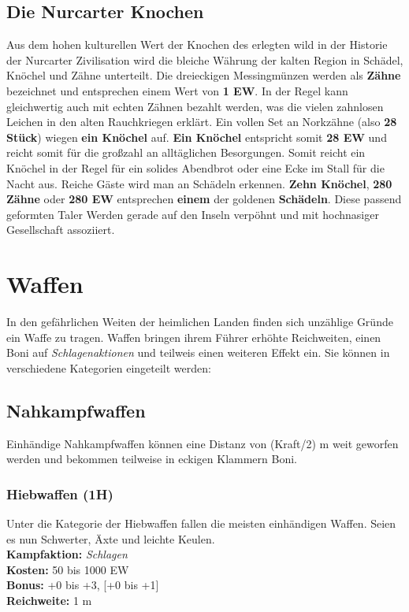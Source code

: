 \subsection*{Die Nurcarter Knochen}
Aus dem hohen kulturellen Wert der Knochen des erlegten wild in der Historie der Nurcarter Zivilisation wird die bleiche Währung der kalten Region in Schädel, Knöchel und Zähne unterteilt.
Die dreieckigen Messingmünzen werden als \textbf{Zähne} bezeichnet und entsprechen einem Wert von \textbf{1 EW}. In der Regel kann gleichwertig auch mit echten Zähnen bezahlt werden, was die vielen zahnlosen Leichen in den alten Rauchkriegen erklärt. Ein vollen Set an Norkzähne (also \textbf{28 Stück}) wiegen \textbf{ein Knöchel} auf. \textbf{Ein Knöchel} entspricht somit \textbf{28 EW} und reicht somit für die großzahl an alltäglichen Besorgungen. Somit reicht ein Knöchel in der Regel für ein solides Abendbrot oder eine Ecke im Stall für die Nacht aus. Reiche Gäste wird man an Schädeln erkennen. \textbf{Zehn Knöchel}, \textbf{280 Zähne} oder \textbf{280 EW} entsprechen \textbf{einem} der goldenen \textbf{Schädeln}. Diese passend geformten Taler Werden gerade auf den Inseln verpöhnt und mit hochnasiger Gesellschaft assoziiert.


\section{Waffen} \label{waffen}
In den gefährlichen Weiten der heimlichen Landen finden sich unzählige Gründe ein Waffe zu tragen. Waffen bringen ihrem Führer erhöhte Reichweiten, einen Boni auf \textit{Schlagenaktionen} und teilweis einen weiteren Effekt ein. Sie können in verschiedene Kategorien eingeteilt werden:\\

\subsection*{Nahkampfwaffen}
Einhändige Nahkampfwaffen können eine Distanz von (Kraft/2) m weit geworfen werden und bekommen teilweise in eckigen Klammern Boni.

\subsubsection*{Hiebwaffen (1H)} \label{ar:hiebwaffe}
Unter die Kategorie der Hiebwaffen fallen die meisten einhändigen Waffen. Seien es nun Schwerter, Äxte und leichte Keulen.\\
\textbf{Kampfaktion:} \textit{Schlagen}\\
\textbf{Kosten:} 50 bis 1000 EW\\
\textbf{Bonus:} +0 bis +3, [+0 bis +1]\\
\textbf{Reichweite:} 1 m

